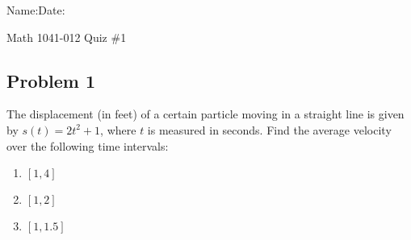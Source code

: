 \documentclass[10pt]{book}
\theoremstyle{definition}
\begin{document}
\begin{flushleft}
Name:\underline{\hspace{13cm}}Date:\underline{\hspace{2cm}}
\end{flushleft}
\begin{center}
{\Large Math 1041-012 \hspace{0.5cm} Quiz \#1}
\end{center}
\vspace{0.2 cm}
\subsection*{Problem 1}The displacement (in feet) of a certain particle moving in a straight line is given by $s(t)=2t^2+1$, where $t$ is measured in seconds. Find the average velocity over the following time intervals:
\begin{enumerate}[label=(\alph*)]
    \item $[1,4]$\\ \vspace{0.5cm}
    \item $[1,2]$\\ \vspace{0.5cm}
    \item $[1,1.5]$\\ \vspace{0.5cm}
\end{enumerate}
\end{document}
